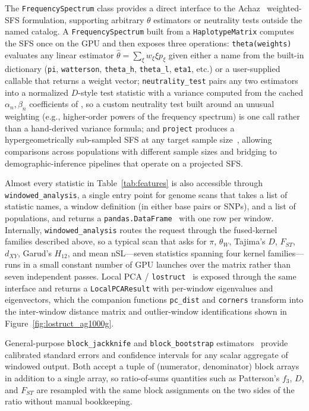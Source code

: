 \documentclass[12pt]{article}
\newcommand{\citep}{\parencite}
\newcommand{\citet}{\textcite}
\newcommand{\lostruct}{\texttt{lostruct}\xspace}
\begin{document}
The \texttt{FrequencySpectrum} class provides a direct interface to the
Achaz~\citep{achaz2009} weighted-SFS formulation, supporting arbitrary
$\theta$ estimators or neutrality tests outside the named catalog. A
\texttt{FrequencySpectrum} built from a \texttt{HaplotypeMatrix}
computes the SFS once on the GPU and then exposes three operations:
\texttt{theta(weights)} evaluates any linear estimator
$\hat\theta = \sum_\xi w_\xi \xi p_\xi$ given either a name from the
built-in dictionary (\texttt{pi}, \texttt{watterson}, \texttt{theta\_h},
\texttt{theta\_l}, \texttt{eta1}, etc.) or a user-supplied callable
that returns a weight vector; \texttt{neutrality\_test} pairs any two
estimators into a normalized $D$-style test statistic with a variance
computed from the cached $\alpha_n,\beta_n$ coefficients of
\citet{achaz2009}, so a custom neutrality test built around an unusual
weighting (e.g., higher-order powers of the frequency spectrum)
is one call rather than a hand-derived variance formula; and
\texttt{project} produces a hypergeometrically sub-sampled SFS at any
target sample size~\citep{gutenkunst2009}, allowing comparisons across
populations with different sample sizes and bridging to
demographic-inference pipelines that operate on a projected SFS.

Almost every statistic in Table~\ref{tab:features} is also accessible
through \texttt{windowed\_analysis}, a single entry point for genome
scans that takes a list of statistic names, a window definition (in
either base pairs or SNPs), and a list of populations, and returns a
\texttt{pandas.DataFrame}~\citep{mckinney2010} with one row per window.
Internally, \texttt{windowed\_analysis} routes the request through the
fused-kernel families described above, so a
typical scan that asks for $\pi$, $\theta_W$, Tajima's $D$, $F_{ST}$,
$d_{XY}$, Garud's $H_{12}$, and mean nSL---seven statistics spanning
four kernel families---runs in a small constant number of GPU launches
over the matrix rather than seven independent passes. Local PCA /
\lostruct~\citep{li2019} is exposed through the same interface and
returns a \texttt{LocalPCAResult} with per-window eigenvalues and
eigenvectors, which the companion functions \texttt{pc\_dist} and
\texttt{corners} transform into the inter-window distance matrix and
outlier-window identifications shown in
Figure~\ref{fig:lostruct_ag1000g}.

General-purpose \texttt{block\_jackknife} and \texttt{block\_bootstrap}
estimators~\citep{busing1999, efron1993} provide calibrated standard
errors and confidence intervals for any scalar aggregate of windowed
output. Both accept a tuple of (numerator, denominator) block arrays in
addition to a single array, so ratio-of-sums quantities such as
Patterson's $f_3$, $D$, and $F_{ST}$ are resampled with the same block
assignments on the two sides of the ratio without manual bookkeeping.
\end{document}
